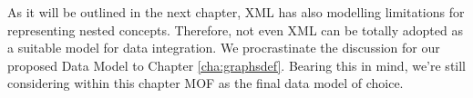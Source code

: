 As it will be outlined in the next chapter, XML has also modelling limitations for representing nested concepts. Therefore, not even XML can be totally adopted as a suitable model for data integration. We procrastinate the discussion for our proposed Data Model to Chapter \ref{cha:graphsdef}. Bearing this in mind, we're still considering within this chapter MOF as the final data model of choice. 